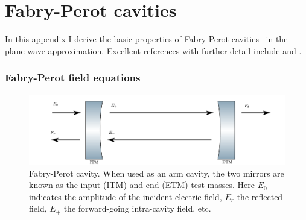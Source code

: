 \chapter{Fabry-Perot cavities}
\label{sec:cavities}
In this appendix I derive the basic properties of Fabry-Perot
cavities~\cite{Fabry1892Theorie,Fabry1901New} in the plane wave approximation.
Excellent references with further detail include \cite{Siegman1990Lasers} and \cite{Fox1961Resonant}.

\subsection{Fabry-Perot field equations}

\begin{figure}
\includegraphics[]{figures/cavity.pdf}
\caption[Fabry-Perot Cavity]{\label{fig:fabry-perot}Fabry-Perot
  cavity.  When used as an arm cavity, the two mirrors are known as
  the input (ITM) and end (ETM) test masses.  Here $E_0$ indicates the
  amplitude of the incident electric field, $E_r$ the reflected field,
  $E_+$ the forward-going intra-cavity field, etc.}
\end{figure}

